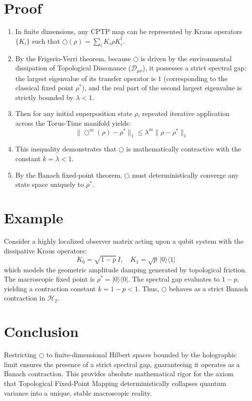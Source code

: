 \documentclass[12pt,openany]{book}
\theoremstyle{plain}
\theoremstyle{definition}
\theoremstyle{remark}
\begin{document}
\section{Proof}
\begin{enumerate}
    \item In finite dimensions, any CPTP map can be represented by Kraus operators $\{K_i\}$ such that $\bigcirc(\rho) = \sum_i K_i \rho K_i^\dagger$.
    \item By the Frigerio-Verri theorem, because $\bigcirc$ is driven by the environmental dissipation of Topological Dissonance ($\mathcal{D}_{\mu\nu}$), it possesses a strict spectral gap: the largest eigenvalue of its transfer operator is $1$ (corresponding to the classical fixed point $\rho^*$), and the real part of the second largest eigenvalue is strictly bounded by $\lambda < 1$.
    \item Then for any initial superposition state $\rho$, repeated iterative application across the Torus-Time manifold yields:
\[
    \|\bigcirc^m(\rho) - \rho^*\|_1 \le \lambda^m \|\rho - \rho^*\|_1
\]
    \item This inequality demonstrates that $\bigcirc$ is mathematically contractive with the constant $k = \lambda < 1$.
    \item By the Banach fixed-point theorem, $\bigcirc$ must deterministically converge any state space uniquely to $\rho^*$.
\end{enumerate}

\section{Example}
Consider a highly localized observer matrix acting upon a qubit system with the dissipative Kraus operators:
\[
K_0 = \sqrt{1-p}\, I, \quad K_1 = \sqrt{p}\, |0\rangle\langle 1|
\]
which models the geometric amplitude damping generated by topological friction. The macroscopic fixed point is $\rho^* = |0\rangle\langle 0|$. The spectral gap evaluates to $1-p$, yielding a contraction constant $k = 1-p < 1$. Thus, $\bigcirc$ behaves as a strict Banach contraction in $\mathcal{H}_2$.

\section{Conclusion}
Restricting $\bigcirc$ to finite-dimensional Hilbert spaces bounded by the holographic limit ensures the presence of a strict spectral gap, guaranteeing it operates as a Banach contraction. This provides absolute mathematical rigor for the axiom that Topological Fixed-Point Mapping deterministically collapses quantum variance into a unique, stable macroscopic reality.
\end{document}
